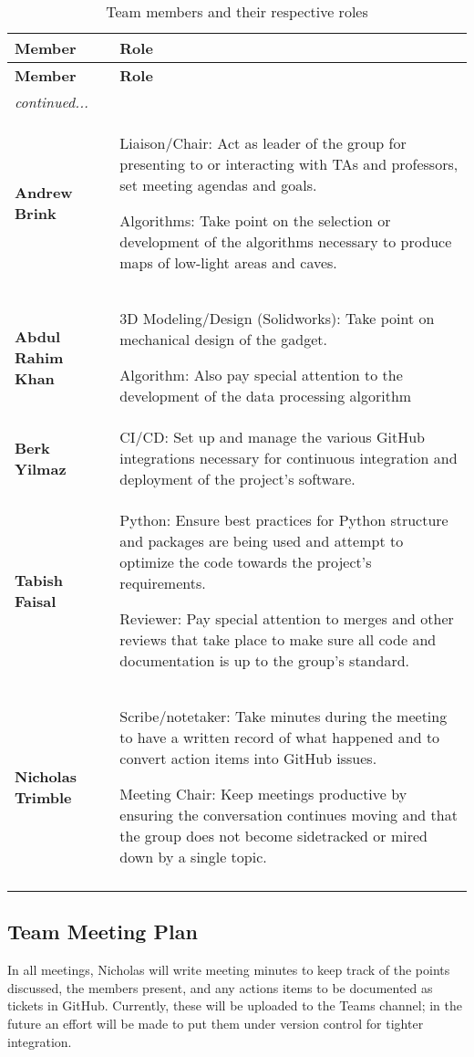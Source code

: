 \documentclass[11pt]{article}
\begin{document}
		\begin{longtable}{p{} p{}}
			\toprule
			\textbf{Member} & \textbf{Role} \\
			\toprule
			\endfirsthead
			
			\toprule
			\textbf{Member} & \textbf{Role} \\
			\toprule
			\endhead
			
			\midrule
			\textit{continued...} & \\
			\bottomrule
			\endfoot
			
			\endlastfoot
			
			\textbf{Andrew Brink} & Liaison/Chair: Act as leader of the group for presenting to or interacting with TAs and professors, set meeting agendas and goals. 
			
			Algorithms: Take point on the selection or development of the algorithms necessary to produce maps of low-light areas and caves. \\
			\midrule
			\textbf{Abdul Rahim Khan} & 3D Modeling/Design (Solidworks): Take point on mechanical design of the gadget.
			
			Algorithm: Also pay special attention to the development of the data processing algorithm
			\\
			\midrule
			\textbf{Berk Yilmaz} & CI/CD: Set up and manage the various GitHub integrations necessary for continuous integration and deployment of the project’s software. \\
			\midrule
			\textbf{Tabish Faisal} & Python: Ensure best practices for Python structure and packages are being used and attempt to optimize the code towards the project’s requirements.
			
			Reviewer: Pay special attention to merges and other reviews that take place to make sure all code and documentation is up to the group’s standard.
			\\
			\midrule
			\textbf{Nicholas Trimble} & Scribe/notetaker: Take minutes during the meeting to have a written record of what happened and to convert action items into GitHub issues.
			
			Meeting Chair: Keep meetings productive by ensuring the conversation continues moving and that the group does not become sidetracked or mired down by a single topic.
			\\
			\bottomrule
			\caption{Team members and their respective roles}
		\end{longtable}
		
	
		\subsection{Team Meeting Plan} %
			In all meetings, Nicholas will write meeting minutes to keep track of the points discussed, the members present, and any actions items to be documented as tickets in GitHub. Currently, these will be uploaded to the Teams channel; in the future an effort will be made to put them under version control for tighter integration.
\end{document}
